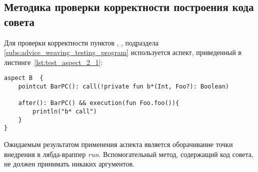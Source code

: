 \subsection{Методика проверки корректности построения кода совета}
\label{sub:advice_building_methodology}
Для проверки корректности пунктов \quotes{\ref{list:lambda_wrapper_check}},
\quotes{\ref{list:buffer_method_check}},
\quotes{\ref{list:pointcut_call_check}} подраздела \ref{subs:advice_weaving_testing_program}  используется аспект, приведенный в листинге~\ref{lst:test_aspect_2_1}:
\begin{lstlisting}[style={java}, label={lst:test_aspect_2_1},
  caption={Пример тестового аспекта}]
aspect B  {
    pointcut BarPC(): call(!private fun b*(Int, Foo?): Boolean)

    after(): BarPC() && execution(fun Foo.foo()){
        println("b* call")
    }
}
\end{lstlisting}
Ожидаемым результатом применения аспекта является оборачивание точки внедрения в лябда-враппер \textit{run}.
Вспомогательный метод, содержащий код совета, не должен принимать никаких аргументов.


